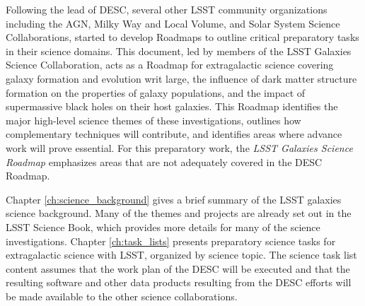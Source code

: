 {Following the lead of DESC, several other LSST community organizations 
including the AGN, Milky Way and Local Volume, and Solar System Science
Collaborations,
started to develop Roadmaps to outline critical preparatory tasks in
their science domains.
This document, led by members of the LSST Galaxies Science Collaboration, 
acts as a Roadmap for extragalactic science covering
galaxy formation and evolution writ large, the influence of dark matter structure
formation on the properties of galaxy populations, and the impact of supermassive
black holes on their host galaxies.
This Roadmap identifies the major high-level
science themes of these investigations, outlines how complementary techniques
will contribute, and identifies areas where advance work will prove essential. For this
preparatory work, the {\it LSST Galaxies Science Roadmap} emphasizes areas that are not adequately 
covered in the DESC Roadmap. 

Chapter \ref{ch:science_background} gives a brief summary of the LSST galaxies science background.
Many of the themes and projects are already set out in the LSST Science Book, 
which provides more details for many of the science investigations. 
Chapter \ref{ch:task_lists} presents preparatory science tasks for 
extragalactic science with LSST, organized by science topic.
The science task list content assumes that the work plan of the DESC will be executed
and that the resulting software and other data products resulting from the DESC
efforts will be made available to the other science collaborations.
}
\let\cleardoublepage\clearpage

